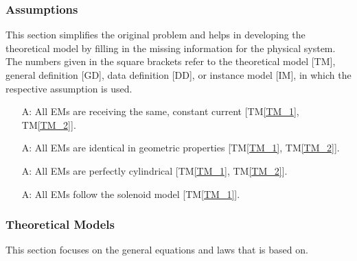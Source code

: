 \documentclass[12pt]{article}
\newcommand{\tref}[1]{TM\ref{#1}}
\newcounter{assumpnum} %
\begin{document}
\subsubsection{Assumptions} \label{sec_assumpt}
This section simplifies the original problem and helps in developing the
theoretical model by filling in the missing information for the physical system.
The numbers given in the square brackets refer to the theoretical model [TM],
general definition [GD], data definition [DD], or instance model [IM], in which the respective assumption is used.
\begin{itemize}
\item[A\refstepcounter{assumpnum}\theassumpnum \label{a_current}:] All EMs are receiving the same, constant current [\tref{TM_1}, \tref{TM_2}]. 
\item[A\refstepcounter{assumpnum}\theassumpnum \label{a_geom}:] All EMs are identical in geometric properties [\tref{TM_1}, \tref{TM_2}]. 
\item[A\refstepcounter{assumpnum}\theassumpnum \label{a_cyl}:] All EMs are perfectly cylindrical [\tref{TM_1}, \tref{TM_2}].
\item[A\refstepcounter{assumpnum}\theassumpnum \label{solenoid_a}:] All EMs follow the solenoid model [\tref{TM_1}].
\end{itemize}

\subsubsection{Theoretical Models}\label{sec_theoretical}
This section focuses on the general equations and laws that \progname{} is based on.
~\newline
\end{document}
